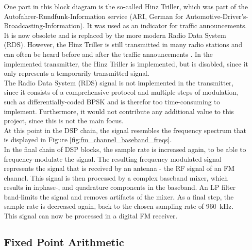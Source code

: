 One part in this block diagram is the so-called Hinz Triller, which was part of the Autofahrer-Rundfunk-Information service (ARI, German for Automotive-Driver's-Broadcasting-Information).
It was used as an indicator for traffic announcements.
It is now obsolete and is replaced by the more modern Radio Data System (RDS).
However, the Hinz Triller is still transmitted in many radio stations and can often be heard before and after the traffic announcements \cite{HinzTriller}.
In the implemented transmitter, the Hinz Triller is implemented, but is disabled, since it only represents a temporarily transmitted signal.\\

The Radio Data System (RDS) signal is not implemented in the transmitter, since it consists of a comprehensive protocol and multiple steps of modulation, such as differentially-coded BPSK \cite{IntroFmStereoRdsModulation} and is therefor too time-consuming to implement.
Furthermore, it would not contribute any additional value to this project, since this is not the main focus.\\

At this point in the DSP chain, the signal resembles the frequency spectrum that is displayed in Figure \ref{fig:fm_channel_baseband_freqs}.\\

In the final chain of DSP blocks, the sample rate is increased again, to be able to frequency-modulate the signal.
The resulting frequency modulated signal represents the signal that is received by an antenna - the RF signal of an FM channel.
This signal is then processed by a complex baseband mixer, which results in inphase-, and quadrature components in the baseband.
An LP filter band-limits the signal and removes artifacts of the mixer.
As a final step, the sample rate is decreased again, back to the chosen sampling rate of 960~kHz.
This signal can now be processed in a digital FM receiver.


\subsection{Fixed Point Arithmetic}

